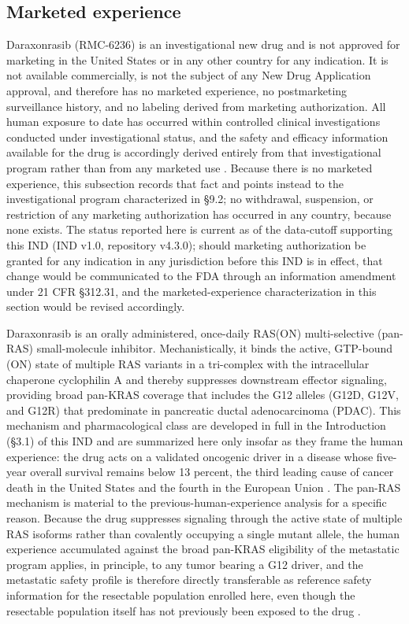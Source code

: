 \subsection{Marketed experience}

Daraxonrasib (RMC-6236) is an investigational new drug and is not approved for
marketing in the United States or in any other country for any indication. It is
not available commercially, is not the subject of any New Drug Application
approval, and therefore has no marketed experience, no postmarketing surveillance
history, and no labeling derived from marketing authorization. All human exposure
to date has occurred within controlled clinical investigations conducted under
investigational status, and the safety and efficacy information available for the
drug is accordingly derived entirely from that investigational program rather than
from any marketed use \cite{daraxwhipple}. Because there is no marketed experience,
this subsection records that fact and points instead to the investigational
program characterized in \S 9.2; no withdrawal, suspension, or restriction of any
marketing authorization has occurred in any country, because none exists. The
status reported here is current as of the data-cutoff supporting this IND (IND
v1.0, repository v4.3.0); should marketing authorization be granted for any
indication in any jurisdiction before this IND is in effect, that change would be
communicated to the FDA through an information amendment under 21 CFR \S 312.31,
and the marketed-experience characterization in this section would be revised
accordingly.

Daraxonrasib is an orally administered, once-daily RAS(ON) multi-selective
(pan-RAS) small-molecule inhibitor. Mechanistically, it binds the active,
GTP-bound (ON) state of multiple RAS variants in a tri-complex with the
intracellular chaperone cyclophilin A and thereby suppresses downstream effector
signaling, providing broad pan-KRAS coverage that includes the G12 alleles
(G12D, G12V, and G12R) that predominate in pancreatic ductal adenocarcinoma
(PDAC). This mechanism and pharmacological class are developed in full in the
Introduction (\S 3.1) of this IND and are summarized here only insofar as they
frame the human experience: the drug acts on a validated oncogenic driver in a
disease whose five-year overall survival remains below 13 percent, the third
leading cause of cancer death in the United States and the fourth in the European
Union \cite{pdac060s2030}. The pan-RAS mechanism is material to the
previous-human-experience analysis for a specific reason. Because the drug
suppresses signaling through the active state of multiple RAS isoforms rather than
covalently occupying a single mutant allele, the human experience accumulated
against the broad pan-KRAS eligibility of the metastatic program applies, in
principle, to any tumor bearing a G12 driver, and the metastatic safety profile
is therefore directly transferable as reference safety information for the
resectable population enrolled here, even though the resectable population itself
has not previously been exposed to the drug \cite{daraxwhipple, oncotrialllm}.


